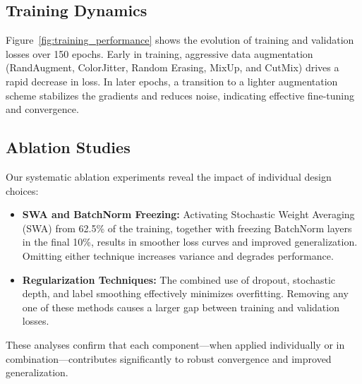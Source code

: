 \documentclass[letterpaper]{article}
\begin{document}
\subsection{Training Dynamics}
Figure~\ref{fig:training_performance} shows the evolution of training and validation losses over 150 epochs. Early in training, aggressive data augmentation (RandAugment, ColorJitter, Random Erasing, MixUp, and CutMix) drives a rapid decrease in loss. In later epochs, a transition to a lighter augmentation scheme stabilizes the gradients and reduces noise, indicating effective fine-tuning and convergence.

    \subsection{Ablation Studies}
Our systematic ablation experiments reveal the impact of individual design choices:
\begin{itemize}
    \item \textbf{SWA and BatchNorm Freezing:} Activating Stochastic Weight Averaging (SWA) from 62.5\% of the training, together with freezing BatchNorm layers in the final 10\%, results in smoother loss curves and improved generalization. Omitting either technique increases variance and degrades performance.
    \item \textbf{Regularization Techniques:} The combined use of dropout, stochastic depth, and label smoothing effectively minimizes overfitting. Removing any one of these methods causes a larger gap between training and validation losses.
\end{itemize}

These analyses confirm that each component—when applied individually or in combination—contributes significantly to robust convergence and improved generalization.
\end{document}
